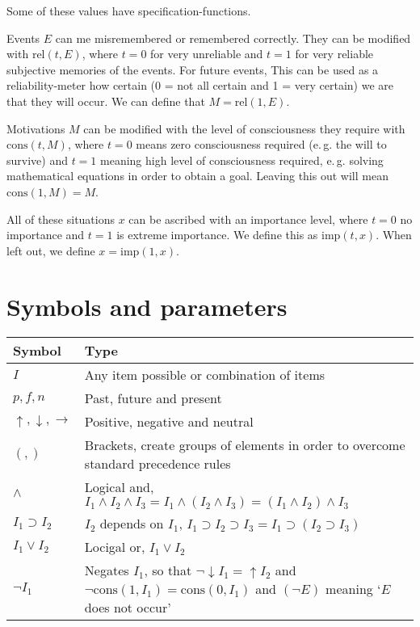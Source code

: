 \documentclass{scrartcl}
\begin{document}
Some of these values have specification-functions.

Events $E$ can me misremembered or remembered correctly. They can be modified with $\textrm{rel}(t, E)$, where $t = 0$ for very unreliable and
$t = 1$ for very reliable subjective memories of the events. For future events, This can be used as a reliability-meter how certain (0 = not all certain
and 1 = very certain) we are that they will occur. We can define that $M = \textrm{rel}(1, E)$.

Motivations $M$ can be modified with the level of consciousness they require with $\textrm{cons}(t, M)$, where $t = 0$ means zero consciousness required
(e.\,g. the will to survive) and $t = 1$ meaning high level of consciousness required, e.\,g. solving mathematical equations in order to obtain a goal.
Leaving this out will mean $\textrm{cons}(1, M) = M$.

All of these situations $x$ can be ascribed with an importance level, where $t = 0$ no importance and $t = 1$ is extreme importance. We define this as
$\textrm{imp}(t, x)$. When left out, we define $x = \textrm{imp}(1, x)$.

\section{Symbols and parameters}

\begin{tabular}{l|l}
	Symbol & Type \\ \hline
	$I$ & Any item possible or combination of items \\
	$p, f, n$ & Past, future and present \\
	$\uparrow, \downarrow, \rightarrow$ & Positive, negative and neutral \\
	$(, )$ & Brackets, create groups of elements in order to overcome standard precedence rules \\
	$\wedge$ & Logical and, $I_1 \wedge I_2 \wedge I_3 =  I_1 \wedge (I_2 \wedge I_3) = (I_1 \wedge I_2) \wedge I_3$\\
	$I_1 \supset I_2$ & $I_2$ depends on $I_1$, $I_1 \supset I_2 \supset I_3 = I_1 \supset (I_2 \supset I_3)$\\
	$I_1 \lor I_2$ & Locigal or, $I_1 \lor I_2$ \\
	$\lnot I_1$ & Negates $I_1$, so that $\lnot \downarrow I_1 = \uparrow I_2$ and $\lnot \textrm{cons}(1, I_1) = \textrm{cons}(0, I_1)$ and $(\lnot E)$ meaning `$E$ does not occur'\footnotemark
\end{tabular}
\end{document}

